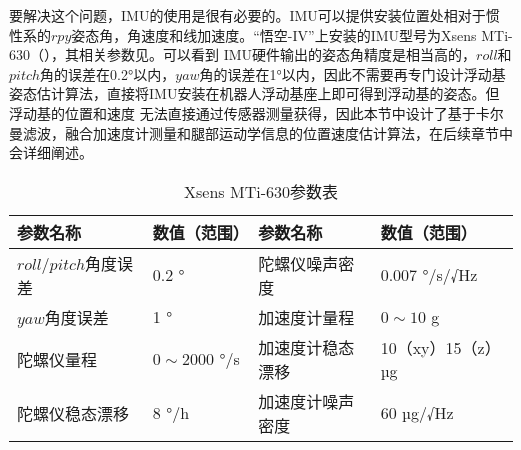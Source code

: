 要解决这个问题，IMU的使用是很有必要的。IMU可以提供安装位置处相对于惯性系的$rpy$姿态角，角速度和线加速度。“悟空-IV”上安装的IMU型号为Xsens MTi-630（），其相关参数见。可以看到
IMU硬件输出的姿态角精度是相当高的，$roll$和$pitch$角的误差在0.2°以内，$yaw$角的误差在1°以内，因此不需要再专门设计浮动基姿态估计算法，直接将IMU安装在机器人浮动基座上即可得到浮动基的姿态。但浮动基的位置和速度
无法直接通过传感器测量获得，因此本节中设计了基于卡尔曼滤波，融合加速度计测量和腿部运动学信息的位置速度估计算法，在后续章节中会详细阐述。
\begin{table}[htbp]
	\centering
	\caption{Xsens MTi-630参数表}
	\label{tab:imu_data}
	\begin{tabular}{m{4cm}<{\centering}m{2.5cm}<{\centering}m{4cm}<{\centering}m{4cm}<{\centering}}
		\toprule  %
		参数名称   &数值（范围） & 参数名称 &数值（范围）  \\
		\midrule  %
		$roll/pitch$角度误差    & 0.2 ° & 陀螺仪噪声密度 & 0.007 °/s/√Hz \\
		$yaw$角度误差 &  1 ° & 加速度计量程 & $0\sim10$ g\\
		陀螺仪量程 & $0\sim2000$ °/s & 加速度计稳态漂移 & 10（xy）15（z） µg \\
        陀螺仪稳态漂移 & 8 °/h & 加速度计噪声密度 & 60 µg/√Hz\\
		\bottomrule %
	\end{tabular}
\end{table}
